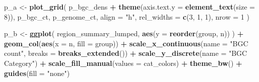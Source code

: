 \documentclass[
]{article}
\newenvironment{Shaded}{\begin{snugshade}}{\end{snugshade}}
\newcommand{\AttributeTok}[1]{\textcolor[rgb]{0.13,0.29,0.53}{#1}}
\newcommand{\DecValTok}[1]{\textcolor[rgb]{0.00,0.00,0.81}{#1}}
\newcommand{\FunctionTok}[1]{\textcolor[rgb]{0.13,0.29,0.53}{\textbf{#1}}}
\newcommand{\NormalTok}[1]{#1}
\newcommand{\OtherTok}[1]{\textcolor[rgb]{0.56,0.35,0.01}{#1}}
\newcommand{\SpecialCharTok}[1]{\textcolor[rgb]{0.81,0.36,0.00}{\textbf{#1}}}
\newcommand{\StringTok}[1]{\textcolor[rgb]{0.31,0.60,0.02}{#1}}
\begin{document}
\begin{Shaded}
\begin{Highlighting}[]
\NormalTok{p\_a }\OtherTok{\textless{}{-}} \FunctionTok{plot\_grid}\NormalTok{(}
\NormalTok{    p\_bgc\_dens }\SpecialCharTok{+} \FunctionTok{theme}\NormalTok{(}\AttributeTok{axis.text.y =} \FunctionTok{element\_text}\NormalTok{(}\AttributeTok{size =} \DecValTok{8}\NormalTok{)), }
\NormalTok{    p\_bgc\_ct, }
\NormalTok{    p\_genome\_ct, }
    \AttributeTok{align =} \StringTok{"h"}\NormalTok{, }
    \AttributeTok{rel\_widths =} \FunctionTok{c}\NormalTok{(}\DecValTok{3}\NormalTok{, }\DecValTok{1}\NormalTok{, }\DecValTok{1}\NormalTok{), }
    \AttributeTok{nrow =} \DecValTok{1}
\NormalTok{    )}

\NormalTok{p\_b }\OtherTok{\textless{}{-}} \FunctionTok{ggplot}\NormalTok{(}
\NormalTok{    region\_summary\_lumped,}
    \FunctionTok{aes}\NormalTok{(}\AttributeTok{y =} \FunctionTok{reorder}\NormalTok{(group, n))}
\NormalTok{) }\SpecialCharTok{+}
  \FunctionTok{geom\_col}\NormalTok{(}\FunctionTok{aes}\NormalTok{(}\AttributeTok{x =}\NormalTok{ n, }\AttributeTok{fill =}\NormalTok{ group)) }\SpecialCharTok{+}
  \FunctionTok{scale\_x\_continuous}\NormalTok{(}\AttributeTok{name =} \StringTok{"BGC count"}\NormalTok{, }\AttributeTok{breaks =} \FunctionTok{breaks\_extended}\NormalTok{()) }\SpecialCharTok{+}
  \FunctionTok{scale\_y\_discrete}\NormalTok{(}\AttributeTok{name =} \StringTok{"BGC Category"}\NormalTok{) }\SpecialCharTok{+}
  \FunctionTok{scale\_fill\_manual}\NormalTok{(}\AttributeTok{values =}\NormalTok{ cat\_colors) }\SpecialCharTok{+}
  \FunctionTok{theme\_bw}\NormalTok{() }\SpecialCharTok{+}
  \FunctionTok{guides}\NormalTok{(}\AttributeTok{fill =} \StringTok{"none"}\NormalTok{)}


\end{Highlighting}
\end{Shaded}
\end{document}
